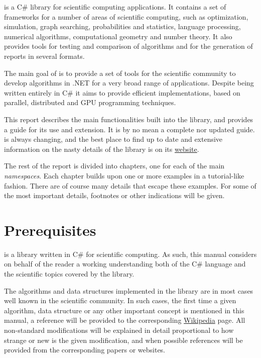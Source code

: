 \sct is a C\# library for scientific computing applications.
It contains a set of frameworks for a number of areas of scientific
computing, such as optimization, simulation, graph searching, 
probabilities and statistics, language processing, numerical algorithms,
computational geometry and number theory. It also provides tools for
testing and comparison of algorithms and for the generation of 
reports in several formats.

The main goal of \sct is to provide a set of tools for
the scientific community to develop algorithms in .NET for 
a very broad range of applications. Despite
being written entirely in C\# it aims to provide efficient
implementations, based on parallel, distributed and GPU programming
techniques. 

This report describes the main functionalities built into
the library, and provides a guide for its use and extension.
It is by no mean a complete nor updated guide. \sct
is always changing, and the best place to find up to date and
extensive information on the nasty details of the library
is on its \href{http://scientifictools.codeplex.com}{website}.

The rest of the report is divided into chapters, one for each
of the \sct main \emph{namespaces}. Each chapter builds upon
one or more examples in a tutorial-like fashion. There are
of course many details that escape these examples. For some
of the most important details, footnotes or other indications will
be given.

\section*{Prerequisites}

\sct is a library written in C\# for scientific computing. As
such, this manual considers on behalf of the reader a working
understanding both of the C\# language and the scientific topics
covered by the library. 

The algorithms and data structures implemented in the library
are in most cases well known in the scientific community.
In such cases, the first time a given algorithm, data structure
or any other important concept is mentioned in this manual, a
reference will be provided to the corresponding 
\href{http://en.wikipedia.org}{Wikipedia} page. All non-standard
modifications will be explained in detail proportional to
how strange or new is the given modification, and when possible
references will be provided from the corresponding papers or
websites.

